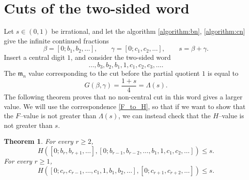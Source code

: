 \documentclass[11pt]{amsart}
\newtheorem{theorem}{Theorem}[section]
\begin{document}
\section{Cuts of the two-sided word}

Let $s\in(0,1)$ be irrational, and let the algorithm \eqref{algorithm:bn}, \eqref{algorithm:cn} give the infinite
continued fractions
$$
        \beta=[0;b_1,b_2,\ldots],
        \qquad
        \gamma=[0;c_1,c_2,\ldots],
        \qquad
        s=\beta+\gamma .
$$
Insert a central digit $1$, and consider the two-sided word
$$
        \ldots,b_3,b_2,b_1,1,c_1,c_2,c_3,\ldots .
$$
The $\mathfrak{m}_n$ value corresponding to the cut before the partial quotient $1$ is equal to
$$
        G(\beta,\gamma)=\frac{1+s}{4}=\Lambda(s).
$$
The following theorem proves that no non-central cut in this word gives a larger value. We will use the correspondence \eqref{F_to_H}, so that if we want to show that the $F$--value is not greater than $\Lambda(s)$, we can instead check that the $H$--value is not greater than $s$.

\begin{theorem}\label{thm:cut-admissibility}
For every $r\ge2$,
\begin{equation}\label{eq:left-cut}
        H\!\left([0;b_r,b_{r+1},\ldots],
        [0;b_{r-1},b_{r-2},\ldots,b_1,1,c_1,c_2,\ldots]\right)
        \le s.
\end{equation}
For every $r\ge1$,
\begin{equation}\label{eq:right-cut}
        H\!\left([0;c_r,c_{r-1},\ldots,c_1,1,b_1,b_2,\ldots],
        [0;c_{r+1},c_{r+2},\ldots]\right)
        \le s.
\end{equation}
\end{theorem}
\end{document}
